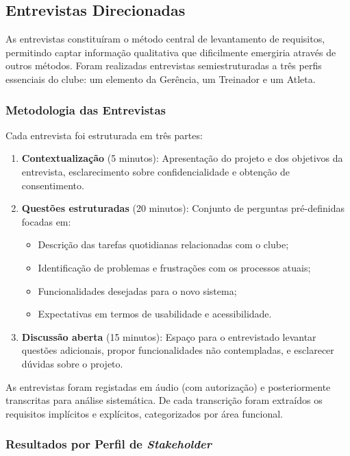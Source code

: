 \documentclass[a4paper,12pt]{scrreprt}
\begin{document}
{\subsection{Entrevistas Direcionadas}

As entrevistas constituíram o método central de levantamento de requisitos, permitindo captar informação qualitativa que dificilmente emergiria através de outros métodos. Foram realizadas entrevistas semiestruturadas a três perfis essenciais do clube: um elemento da Gerência, um Treinador e um Atleta.

\subsubsection{Metodologia das Entrevistas}

Cada entrevista foi estruturada em três partes:

\begin{enumerate}
    \item \textbf{Contextualização} (5 minutos): Apresentação do projeto e dos objetivos da entrevista, esclarecimento sobre confidencialidade e obtenção de consentimento.

    \item \textbf{Questões estruturadas} (20 minutos): Conjunto de perguntas pré-definidas focadas em:
    \begin{itemize}
        \item Descrição das tarefas quotidianas relacionadas com o clube;
        \item Identificação de problemas e frustrações com os processos atuais;
        \item Funcionalidades desejadas para o novo sistema;
        \item Expectativas em termos de usabilidade e acessibilidade.
    \end{itemize}

    \item \textbf{Discussão aberta} (15 minutos): Espaço para o entrevistado levantar questões adicionais, propor funcionalidades não contempladas, e esclarecer dúvidas sobre o projeto.
\end{enumerate}

As entrevistas foram registadas em áudio (com autorização) e posteriormente transcritas para análise sistemática. De cada transcrição foram extraídos os requisitos implícitos e explícitos, categorizados por área funcional.

\subsubsection{Resultados por Perfil de \textit{Stakeholder}}

}
\end{document}
